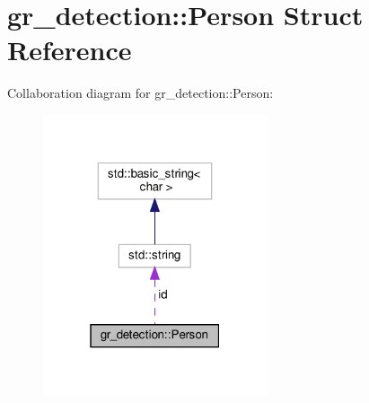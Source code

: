 \hypertarget{structgr__detection_1_1Person}{}\section{gr\+\_\+detection\+:\+:Person Struct Reference}
\label{structgr__detection_1_1Person}


Collaboration diagram for gr\+\_\+detection\+:\+:Person\+:
\nopagebreak
\begin{figure}[H]
\begin{center}
\leavevmode
\includegraphics[width=187pt]{structgr__detection_1_1Person__coll__graph}
\end{center}
\end{figure}
